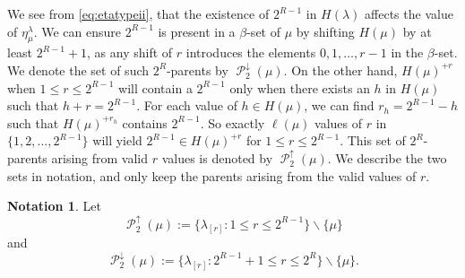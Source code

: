 \documentclass[12pt]{amsart}
\theoremstyle{definition}
\newtheorem{notation}[theorem]{Notation}
\numberwithin{equation}{section}
\newcommand{\la}{\lambda}
\DeclareMathOperator{\p}{\mathcal{P}}
\begin{document}
We see from \cref{eq:etatypeii}, that the existence of $2^{R-1}$ in $H(\la)$ affects the value of $\eta^\la_\mu$. We can ensure $2^{R-1}$ is present in a $\beta$-set of $\mu$ by shifting $H(\mu)$ by at least $2^{R-1}+1$, as any shift of $r$ introduces the elements $0, 1, \ldots, r-1$ in the $\beta$-set. We denote the set of such $2^R$-parents by $\p_2^{\downarrow}(\mu)$. On the other hand, $H(\mu)^{+r}$ when $1\leq r\leq2^{R-1}$ will contain a $2^{R-1}$ only when there exists an $h$ in $H(\mu)$ such that $h+r = 2^{R-1}$. For each value of $h\in H(\mu)$, we can find $r_h = 2^{R-1}-h$ such that $H(\mu)^{+r_h}$ contains $2^{R-1}$. So exactly $\ell(\mu)$ values of $r$ in $\{1,2, \ldots, 2^{R-1}\}$ will yield $2^{R-1}\in H(\mu)^{+r}$ for $1\leq r\leq 2^{R-1}$. This set of $2^R$-parents arising from valid $r$ values is denoted by $\p_2^{\uparrow}(\mu)$. We describe the two sets in notation, and only keep the parents arising from the valid values of $r$.
\begin{notation}\label{not:typeii}
Let \[\p_2^\uparrow(\mu) := \{\lambda_{[r]} : 1\leq r \leq 2^{R-1}\}\backslash \{\mu\}\] and \[\p_2^\downarrow(\mu) := \{\lambda_{[r]}: 2^{R-1}+1 \leq r \leq 2^{R}\}\backslash \{\mu\}.\]
\end{notation}
\end{document}
